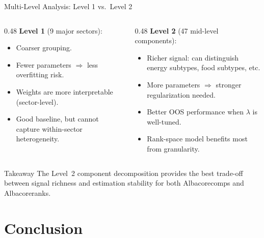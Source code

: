 \documentclass[aspectratio=169, 11pt]{beamer}
\begin{document}
\begin{frame}{Multi-Level Analysis: Level 1 vs.\ Level 2}
  \begin{columns}[T]
    \begin{column}{0.48\textwidth}
      \textbf{Level 1} (9 major sectors):
      \begin{itemize}
        \item Coarser grouping.
        \item Fewer parameters $\Rightarrow$ less overfitting risk.
        \item Weights are more interpretable (sector-level).
        \item Good baseline, but cannot capture within-sector heterogeneity.
      \end{itemize}
    \end{column}
    \begin{column}{0.48\textwidth}
      \textbf{Level 2} (47 mid-level components):
      \begin{itemize}
        \item Richer signal: can distinguish energy subtypes, food subtypes, etc.
        \item More parameters $\Rightarrow$ stronger regularization needed.
        \item Better OOS performance when $\lambda$ is well-tuned.
        \item Rank-space model benefits most from granularity.
      \end{itemize}
    \end{column}
  \end{columns}
  \vfill
  \begin{block}{Takeaway}
    The Level~2 component decomposition provides the best trade-off between
    signal richness and estimation stability for both Albacorecomps and Albacoreranks.
  \end{block}
\end{frame}

\section{Conclusion}
\end{document}
